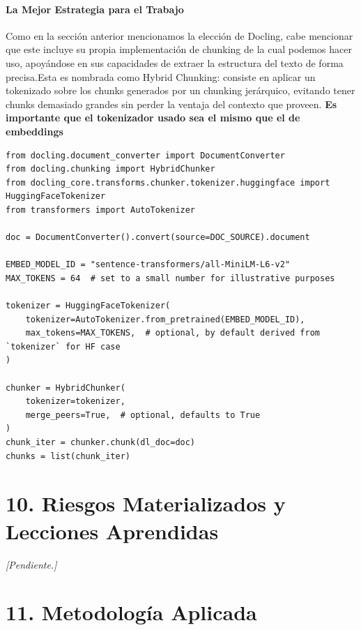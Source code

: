 \documentclass[12pt, a4paper]{report}
\begin{document}
\subsubsection{La Mejor Estrategia para el Trabajo}
Como en la sección anterior mencionamos la elección de Docling, cabe mencionar que este incluye su propia implementación de chunking de la cual podemos hacer uso, apoyándose en sus capacidades de extraer la estructura del texto de forma precisa.Esta es nombrada como Hybrid Chunking: consiste en aplicar un tokenizado sobre los chunks generados por un chunking jerárquico, evitando tener chunks demasiado grandes sin perder la ventaja del contexto que proveen.
\textbf{Es importante que el tokenizador usado sea el mismo que el de embeddings}

\begin{lstlisting}[caption={Ejemplo de uso de HybridChunking}]
from docling.document_converter import DocumentConverter
from docling.chunking import HybridChunker
from docling_core.transforms.chunker.tokenizer.huggingface import HuggingFaceTokenizer
from transformers import AutoTokenizer

doc = DocumentConverter().convert(source=DOC_SOURCE).document

EMBED_MODEL_ID = "sentence-transformers/all-MiniLM-L6-v2"
MAX_TOKENS = 64  # set to a small number for illustrative purposes

tokenizer = HuggingFaceTokenizer(
    tokenizer=AutoTokenizer.from_pretrained(EMBED_MODEL_ID),
    max_tokens=MAX_TOKENS,  # optional, by default derived from `tokenizer` for HF case
)

chunker = HybridChunker(
    tokenizer=tokenizer,
    merge_peers=True,  # optional, defaults to True
)
chunk_iter = chunker.chunk(dl_doc=doc)
chunks = list(chunk_iter)
\end{lstlisting}

\chapter*{10. Riesgos Materializados y Lecciones Aprendidas}

\textit{[Pendiente.]}

\chapter*{11. Metodología Aplicada}
\end{document}
